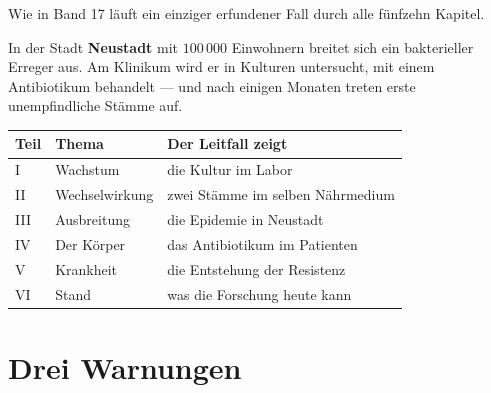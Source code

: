\begin{merksatz}
Wie in Band 17 läuft ein einziger erfundener Fall durch alle fünfzehn Kapitel.

\begin{center}
\begin{minipage}{0.9\textwidth}
In der Stadt \textbf{Neustadt} mit $100\,000$ Einwohnern breitet sich ein bakterieller Erreger aus. Am Klinikum wird er in Kulturen untersucht, mit einem Antibiotikum behandelt --- und nach einigen Monaten treten erste unempfindliche Stämme auf.
\end{minipage}
\end{center}

\begin{center}
{\small
\renewcommand{\arraystretch}{1.5}
\begin{tabular}{@{}P{1.6cm}P{2.8cm}P{3.6cm}@{}}
\toprule
\textbf{Teil} & \textbf{Thema} & \textbf{Der Leitfall zeigt}\\
\midrule
I & Wachstum & die Kultur im Labor\\
II & Wechselwirkung & zwei Stämme im selben Nährmedium\\
III & Ausbreitung & die Epidemie in Neustadt\\
IV & Der Körper & das Antibiotikum im Patienten\\
V & Krankheit & die Entstehung der Resistenz\\
VI & Stand & was die Forschung heute kann\\
\bottomrule
\end{tabular}}
\end{center}

\begin{center}
\begin{minipage}{0.88\textwidth}
\end{minipage}
\end{center}
\end{merksatz}

\section*{Drei Warnungen}

